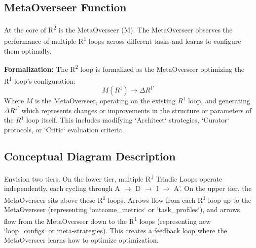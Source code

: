 \documentclass{article}
\begin{document}
\subsection{MetaOverseer Function}
At the core of R\textsuperscript{2} is the MetaOverseer (M). The MetaOverseer observes the performance of multiple R\textsuperscript{1} loops across different tasks and learns to configure them optimally.

\textbf{Formalization:}
The R\textsuperscript{2} loop is formalized as the MetaOverseer optimizing the R\textsuperscript{1} loop's configuration:
$$ M(R^1) \rightarrow \Delta R^{1'} $$
Where $M$ is the MetaOverseer, operating on the existing $R^1$ loop, and generating $\Delta R^{1'}$ which represents changes or improvements in the structure or parameters of the $R^1$ loop itself. This includes modifying `Architect` strategies, `Curator` protocols, or `Critic` evaluation criteria.

\subsection{Conceptual Diagram Description}
Envision two tiers. On the lower tier, multiple R\textsuperscript{1} Triadic Loops operate independently, each cycling through A $\rightarrow$ D $\rightarrow$ I $\rightarrow$ A'. On the upper tier, the MetaOverseer sits above these R\textsuperscript{1} loops. Arrows flow from each R\textsuperscript{1} loop up to the MetaOverseer (representing `outcome_metrics` or `task_profiles`), and arrows flow from the MetaOverseer down to the R\textsuperscript{1} loops (representing new `loop_configs` or meta-strategies). This creates a feedback loop where the MetaOverseer learns how to optimize optimization.
\end{document}
